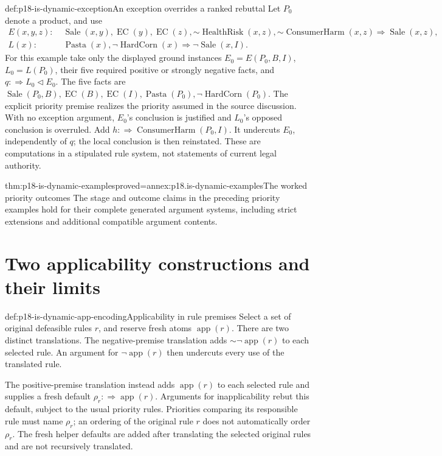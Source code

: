 \begin{hbexample}{def:p18-is-dynamic-exception}{An exception overrides a ranked rebuttal}
Let \(P_0\) denote a product, and use
\[
\begin{split}
E(x,y,z):\;&\operatorname{Sale}(x,y),\operatorname{EC}(y),
 \operatorname{EC}(z),\mathord{\sim}\operatorname{HealthRisk}(x,z),
 \mathord{\sim}\operatorname{ConsumerHarm}(x,z)
 \Rightarrow\operatorname{Sale}(x,z),\\
L(x):\;&\operatorname{Pasta}(x),\neg\operatorname{HardCorn}(x)
                                      \Rightarrow\neg\operatorname{Sale}(x,I).
\end{split}
\]
For this example take only the displayed ground instances
\(E_0=E(P_0,B,I)\), \(L_0=L(P_0)\), their five required positive
or strongly negative facts, and
\(q:\Rightarrow L_0\triangleleft E_0\).
The five facts are
\(\operatorname{Sale}(P_0,B),\operatorname{EC}(B),\operatorname{EC}(I),
\operatorname{Pasta}(P_0),\neg\operatorname{HardCorn}(P_0)\).
The explicit priority premise realizes the priority assumed in the
source discussion. With no exception argument, \(E_0\)'s conclusion
is justified and \(L_0\)'s opposed conclusion is overruled.
Add \(h:\Rightarrow\operatorname{ConsumerHarm}(P_0,I)\).
It undercuts \(E_0\), independently of \(q\); the local conclusion
is then reinstated. These are computations in a stipulated rule
system, not statements of current legal authority.
\end{hbexample}

\begin{hbtheorem}{thm:p18-is-dynamic-examples}{proved=annex:p18.is-dynamic-examples}{The worked priority outcomes}
The stage and outcome claims in the preceding priority examples hold
for their complete generated argument systems, including strict
extensions and additional compatible argument contents.
\end{hbtheorem}

\section{Two applicability constructions and their limits}

\begin{hbdefinition}{def:p18-is-dynamic-app-encoding}{Applicability in rule premises}
Select a set of original defeasible rules \(r\), and reserve fresh
atoms \(\operatorname{app}(r)\). There are two distinct translations.
The negative-premise translation adds
\(\mathord{\sim}\neg\operatorname{app}(r)\) to each selected rule.
An argument for \(\neg\operatorname{app}(r)\) then undercuts every
use of the translated rule.

The positive-premise translation instead adds
\(\operatorname{app}(r)\) to each selected rule and supplies a fresh
default \(\rho_r:\Rightarrow\operatorname{app}(r)\).
Arguments for inapplicability rebut this default, subject to the
usual priority rules. Priorities comparing its responsible rule
must name \(\rho_r\); an ordering of the original rule \(r\) does
not automatically order \(\rho_r\).
The fresh helper defaults are added after translating the selected
original rules and are not recursively translated.
\end{hbdefinition}

